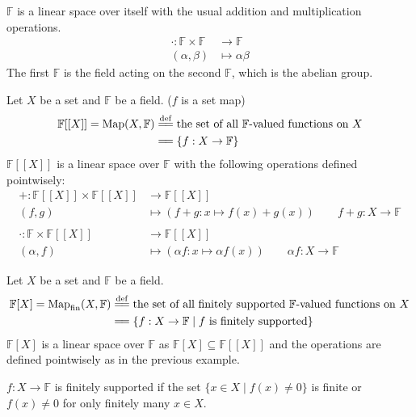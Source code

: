 \documentclass[
	11pt, %
	fleqn, %
	a4paper, %
]{LegrandOrangeBook}
\newcommand{\F}{\mathbb{F}} %
\newcommand{\Map}[2]{\text{Map}(#1, #2)} %
\begin{document}
\begin{example}
    $\F$ is a linear space over itself with the usual addition and multiplication operations.
    \[
        \begin{split}
            \cdot : \F \times \F &\to \F \\
            (\alpha,\beta) &\mapsto \alpha \beta
        \end{split}
    \]
    The first $\F$ is the field acting on the second $\F$, which is the abelian group.
\end{example}

\begin{example}
    Let $X$ be a set and $\F$ be a field. ($f$ is a set map)
    \[
    \begin{split}
        \F[[X]] = \Map{X}{\F} &\overset{\mathrm{def}}{=\joinrel=} \text{the set of all $\F$-valued functions on } X \\
        &=\joinrel= \left\{ f : X \to \F \right\}
    \end{split}
    \]
    $\F[[X]]$ is a linear space over $\F$ with the following operations defined pointwisely:
    \[
        \begin{split}
            + : \F[[X]] \times \F[[X]] &\to \F[[X]] \\
            (f,g) &\mapsto (f+g: x \mapsto f(x) + g(x)) \qquad f + g : X \to \F \\ \\
            \cdot : \F \times \F[[X]] &\to \F[[X]] \\
            (\alpha,f) &\mapsto (\alpha f: x \mapsto \alpha f(x)) \qquad \alpha f : X \to \F
        \end{split}
    \]
\end{example}

\begin{example}
    Let $X$ be a set and $\F$ be a field.
    \[
        \begin{split}
            \F[X] = \text{Map}_{\text{fin}}(X, \F) &\overset{\mathrm{def}}{=\joinrel=} \text{the set of all finitely supported $\F$-valued functions on } X \\
            &=\joinrel= \left\{ f : X \to \F \mid f \text{ is finitely supported} \right\}
        \end{split}
    \]
    $\F[X]$ is a linear space over $\F$ as $\F[X] \subseteq \F[[X]]$ and the operations are defined pointwisely as in the previous example.

    $f: X \to \F$ is finitely supported if the set $\{ x \in X \mid f(x) \neq 0 \}$ is finite or $f(x) \neq 0$ for only finitely many $x \in X$.
\end{example}
\end{document}
